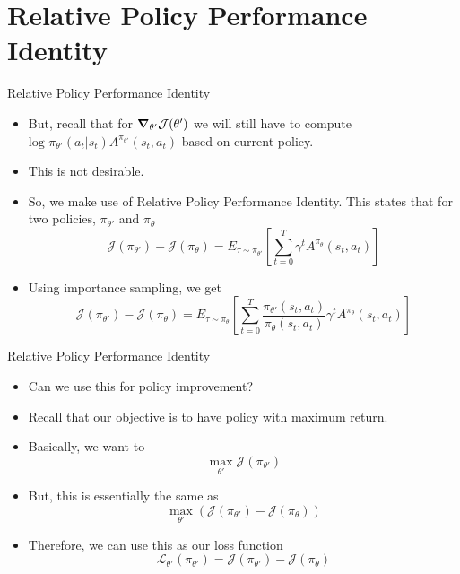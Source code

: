 \section{Relative Policy Performance Identity}
\begin{frame}{Relative Policy Performance Identity}
\begin{itemize}
    \item But, recall that for $\gradient_{\theta'} \mathcal{J}({\theta'})$ we will still have to compute $\text{log } \pi_{\theta'} (a_t|s_t) A^{\pi_{\theta'}}(s_t,a_t)$ based on current policy.
    \item This is not desirable.
    \pause
    \item So, we make use of Relative Policy Performance Identity. This states that for two policies, $\pi_{\theta'}$ and $\pi_{\theta}$
    $$\mathcal{J}(\pi_{\theta'}) - \mathcal{J}(\pi_{\theta}) = E_{\tau \sim \pi_{\theta'}} \left [ \sum^{T}_{t=0} \gamma^t A^{\pi_{\theta}}(s_t, a_t) \right ]$$
    \pause
    \item Using importance sampling, we get
    $$\mathcal{J}(\pi_{\theta'}) - \mathcal{J}(\pi_{\theta}) = E_{\tau \sim \pi_{\theta}} \left [ \sum^{T}_{t=0} \frac{\pi_{\theta'} (s_{t}, a_{t})}{\pi_{\theta} (s_{t}, a_{t})} \gamma^t A^{\pi_{\theta}}(s_t, a_t) \right ]$$
    
\end{itemize}
    
\end{frame}

\begin{frame}{Relative Policy Performance Identity}
\begin{itemize}
    \item Can we use this for policy improvement?
    \pause
    \item Recall that our objective is to have policy with maximum return.
    \item Basically, we want to
    $$\max_{\theta'} \mathcal{J}(\pi_{\theta'})$$
    \pause
    \item But, this is essentially the same as
    $$\max_{\theta'} ( \mathcal{J}(\pi_{\theta'}) - \mathcal{J}(\pi_{\theta}))$$
    \pause
    \item Therefore, we can use this as our loss function
    $$\mathcal{L}_{\theta'}(\pi_{\theta'}) = \mathcal{J}(\pi_{\theta'}) - \mathcal{J}(\pi_{\theta})$$
\end{itemize}
\end{frame}
